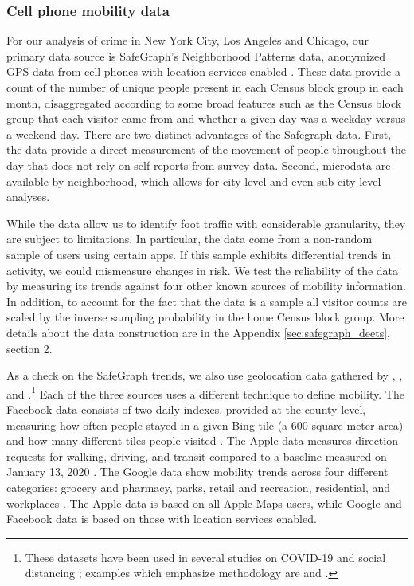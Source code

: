\documentclass[12pt]{article}
\begin{document}
\subsubsection{Cell phone mobility data}
For our analysis of crime in New York City, Los Angeles and Chicago, our primary data source is SafeGraph's Neighborhood Patterns data, anonymized GPS data from cell phones with location services enabled \citep{sg_neighb}. These data provide a count of the number of unique people present in each Census block group in each month, disaggregated according to some broad features such as the Census block group that each visitor came from and whether a given day was a weekday versus a weekend day. %
There are two distinct advantages of the Safegraph data.  First, the data provide a direct measurement of the movement of people throughout the day that does not rely on self-reports from survey data.  Second, microdata are available by neighborhood, which allows for city-level and even sub-city level analyses. 

While the data allow us to identify foot traffic with considerable granularity, they are subject to limitations. In particular, the data come from a non-random sample of users using certain apps. If this sample exhibits differential trends in activity, we could mismeasure changes in risk. We test the reliability of the data by measuring its trends against four other known sources of mobility information. In addition, to account for the fact that the data is a sample all visitor counts are scaled by the inverse sampling probability in the home Census block group. More details about the data construction are in the Appendix \ref{sec:safegraph_deets}, section 2. 
 
As a check on the SafeGraph trends, we also use geolocation data gathered by \citet{google_data}, \citet{apple_data}, and \citet{facebook_data}.\footnote{These datasets have been used in several studies on COVID-19 and social distancing \citep[e.g.][]{cot2021mining, venter2020covid}; examples which emphasize methodology are \citet{ilin2021public} and \citet{arnal2020private}.} Each of the three sources uses a different technique to define mobility. The Facebook data consists of two daily indexes, provided at the county level, measuring how often people stayed in a given Bing tile (a 600 square meter area) and how many different tiles people visited \citep{facebook_mobility}. The Apple data measures direction requests for walking, driving, and transit compared to a baseline measured on January 13, 2020 \citep{cot2021mining}. The Google data show mobility trends across four different categories: grocery and pharmacy, parks, retail and recreation, residential, and workplaces \citep{google_mobility, cot2021mining}. The Apple data is based on all Apple Maps users, while Google and Facebook data is based on those with location services enabled. 
\end{document}
